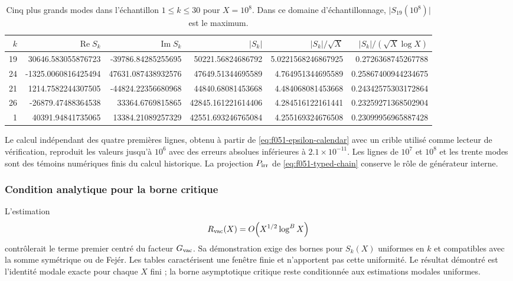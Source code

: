 \begin{table}[htbp]
\centering
\scriptsize
\setlength{\tabcolsep}{3.5pt}
\begin{tabular}{rrrrrr}
\toprule
\(k\) & \(\operatorname{Re}S_k\) & \(\operatorname{Im}S_k\)
 & \(|S_k|\) & \(|S_k|/\sqrt X\) & \(|S_k|/(\sqrt X\log X)\)\\
\midrule
19 & 30646.583055876723 & -39786.84285255695 & 50221.56824686792 & 5.0221568246867925 & 0.2726368745267788\\
24 & -1325.0060816425494 & 47631.087438932576 & 47649.51344695589 & 4.764951344695589 & 0.25867400944234675\\
21 & 1214.7582244307505 & -44824.22356680968 & 44840.68081453668 & 4.484068081453668 & 0.24342575303172864\\
26 & -26879.47488364538 & 33364.6769815865 & 42845.161221614406 & 4.284516122161441 & 0.23259271368502904\\
1 & 40391.94841735065 & 13384.21089257329 & 42551.693246765084 & 4.255169324676508 & 0.23099956965887428\\
\bottomrule
\end{tabular}
\caption{Cinq plus grands modes dans l’échantillon \(1\leq k\leq30\) pour
\(X=10^8\). Dans ce domaine d’échantillonnage,
\(\lvert S_{19}(10^8)\rvert\) est le maximum.}
\label{tab:f051-top-five-modes}
\end{table}

Le calcul indépendant des quatre premières lignes, obtenu à partir de
\eqref{eq:f051-epsilon-calendar} avec un crible utilisé comme lecteur de
vérification, reproduit les valeurs jusqu’à \(10^6\) avec des erreurs absolues
inférieures à \(2.1\times10^{-11}\). Les lignes de \(10^7\) et \(10^8\) et les
trente modes sont des témoins numériques finis du calcul historique. La
projection \(P_{\rm irr}\) de \eqref{eq:f051-typed-chain} conserve le rôle
de générateur interne.

\subsubsection{Condition analytique pour la borne critique}

L’estimation
\begin{equation}
 R_{\rm vac}(X)=O\!\left(X^{1/2}\log^B X\right)
 \label{eq:f051-conditional-bound}
\end{equation}
contrôlerait le terme premier centré du facteur \(G_{\rm vac}\). Sa
démonstration exige des bornes pour \(S_k(X)\) uniformes en \(k\) et compatibles
avec la somme symétrique ou de Fejér. Les tables caractérisent une fenêtre
finie et n’apportent pas cette uniformité. Le résultat démontré est
l’identité modale exacte pour chaque \(X\) fini ; la borne asymptotique critique
reste conditionnée aux estimations modales uniformes.
